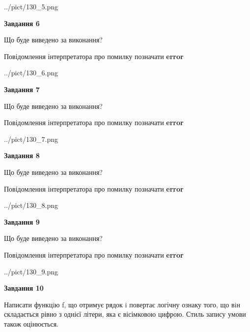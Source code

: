 \documentclass[12pt, ukrainian]{article}
\begin{document}
{\begin {large}
\begin{center}
	{../pict/130_5.png}
\end{center}
\newpage

{\begin {center}\textbf{Завдання 6}\end {center}}\par
Що буде виведено за виконання? \par
Повідомлення інтерпретатора про помилку позначати \textbf{error}

\begin{center}
	{../pict/130_6.png}
\end{center}
\newpage

{\begin {center}\textbf{Завдання 7}\end {center}}\par
Що буде виведено за виконання? \par
Повідомлення інтерпретатора про помилку позначати \textbf{error}

\begin{center}
	{../pict/130_7.png}
\end{center}
\newpage

{\begin {center}\textbf{Завдання 8}\end {center}}\par
Що буде виведено за виконання? \par
Повідомлення інтерпретатора про помилку позначати \textbf{error}

\begin{center}
	{../pict/130_8.png}
\end{center}
\newpage

{\begin {center}\textbf{Завдання 9}\end {center}}\par
Що буде виведено за виконання? \par
Повідомлення інтерпретатора про помилку позначати \textbf{error}

\begin{center}
	{../pict/130_9.png}
\end{center}
\newpage

{\begin {center}\textbf{Завдання 10}\end {center}}\par

Написати функцiю f, що отримує рядок i повертає логічну ознаку того, що вiн складається рівно з однієї літери, яка є вісімковою цифрою. Стиль запису умови також оцінюється.\par
\newpage

\end {large}}
\end{document}
